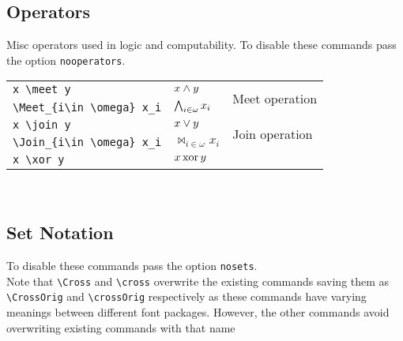\documentclass[leqno,11pt]{amsart}
\begin{document}
\subsection{Operators}
Misc operators used in logic and computability.  To disable these commands pass the option \verb=nooperators=.\\

\begin{tabular}{l |  l | l}\toprule
\verb=x \meet y= 				& \( x \mathbin{\wedge} y \) & \multirow{2}{*}{Meet operation} \\[6pt]
	\verb=\Meet_{i\in \omega} x_i=		& \( \mathop{\bigwedge}_{i\in \omega} x_i \) & \\ \midrule
	\verb=x \join y= 				& \(x  \mathbin{\vee} y \) & \multirow{2}{*}{Join operation}  \\[6pt]
	\verb=\Join_{i\in \omega} x_i=		& \( \Join_{i\in \omega} x_i \) & \\ \midrule
	\verb=x \xor y=						& \( x \operatorname{xor} y \)  & \\ \bottomrule
\end{tabular}          \\	

\subsection{Set Notation}
To disable these commands pass the option \verb=nosets=.\\

Note that \verb=\Cross= and \verb=\cross= overwrite the existing commands saving them as \verb=\CrossOrig= and \verb=\crossOrig= respectively as these commands have varying meanings between different font packages.  However, the other commands avoid overwriting existing commands with that name 
\end{document}
